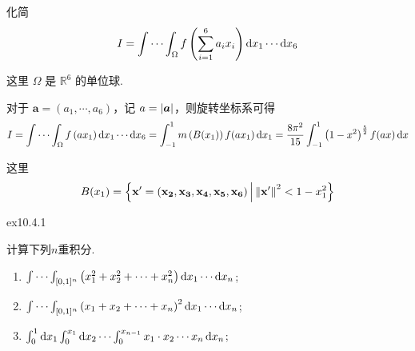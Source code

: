 \begin{exercise}
    化简$$I = \int \cdots \int_{\Omega} f\left( \sum_{i=1}^{6} a_i x_i \right) \operatorname{d\!} x_1 \cdots \operatorname{d\!} x_6$$

    这里 $\Omega$ 是 $\mathbb{R}^6$ 的单位球.
\end{exercise}

\begin{solution}
    对于 $\bm{a} = (a_1, \cdots, a_6)$，记 $a = \abs{\bm{a}}$，则旋转坐标系可得
    \begin{align*}
    I = \int \cdots \int_{\Omega} f\left(ax_1\right) \operatorname{d\!} x_1 \cdots \operatorname{d\!} x_6 
    = \int_{-1}^{1} m\left(B(x_1)\right) f(ax_1) \operatorname{d\!} x_1 
    = \frac{8\pi^2}{15} \int_{-1}^{1} \left(1 - x^2\right)^{\frac{5}{2}} f(ax) \operatorname{d\!} x
    \end{align*}

    这里
    $$
    B(x_1) = \left\{ \bf{x}' = (x_2, x_3, x_4, x_5, x_6) \,\middle|\, \norm{\bf{x}'}^2 < 1 - x_1^2 \right\}
    $$


\end{solution}




\begin{exercise}
    {ex10.4.1}

    计算下列$n$重积分.
    \begin{enumerate}
        \item $\int \cdots \int_{[0,1]^n} \left( x_1^2 + x_2^2 + \cdots + x_n^2 \right) \operatorname{d\!} x_1 \cdots \operatorname{d\!} x_n$;
        \item $\int \cdots \int_{[0,1]^n} \left( x_1 + x_2 + \cdots + x_n \right)^2 \operatorname{d\!} x_1 \cdots \operatorname{d\!} x_n$;
        \item $\int_0^1 \operatorname{d\!} x_1 \int_0^{x_1} \operatorname{d\!} x_2 \cdots \int_0^{x_{n-1}} x_1 \cdot x_2 \cdots x_n \operatorname{d\!} x_n$;
    \end{enumerate}
\end{exercise}

